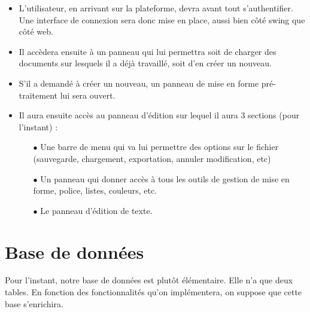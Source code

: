 	\begin{itemize}
	
		\item L'utilisateur, en arrivant sur la plateforme, devra avant tout s'authentifier. Une interface de connexion sera donc mise en place, aussi bien côté swing que côté web.
		
		\item Il accèdera ensuite à un panneau qui lui permettra soit de charger des documents sur lesquels il a déjà travaillé, soit d'en créer un nouveau.
		
		\item S'il a demandé à créer un nouveau, un panneau de mise en forme pré-traitement lui sera ouvert.
		
		\item Il aura ensuite accès au panneau d'édition sur lequel il aura 3 sections (pour l'instant) : \par
		
		\begin{itemize}
			
			\item[$\bullet$] Une barre de menu qui va lui permettre des options sur le fichier (sauvegarde, chargement, exportation, annuler modification, etc)
			
			\item[$\bullet$] Un panneau qui donner accès à tous les outils de gestion de mise en forme, police, listes, couleurs, etc.
			
			\item[$\bullet$] Le panneau d'édition de texte.
		
		\end{itemize}
	
	\end{itemize}		
	
	\section{Base de données}
	
	Pour l'instant, notre base de données est plutôt élémentaire. Elle n'a que deux tables. En fonction des fonctionnalités qu'on implémentera, on suppose que cette base s'enrichira.
	
